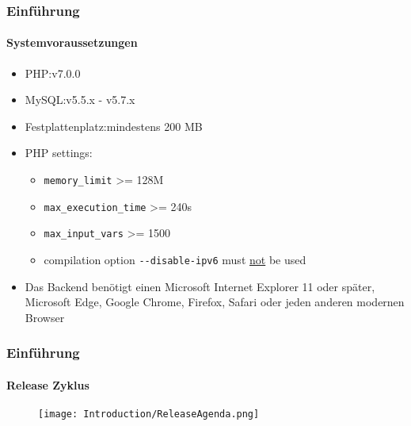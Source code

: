 \begin{frame}[fragile]
	\frametitle{Einführung}
	\framesubtitle{Systemvoraussetzungen}

	\begin{itemize}
		\item PHP:\tabto{3cm}v7.0.0
		\item MySQL:\tabto{3cm}v5.5.x - v5.7.x
		\item Festplattenplatz:\tabto{3cm}mindestens 200 MB
		\item PHP settings:

			\begin{itemize}
				\item \texttt{memory\_limit} >= 128M
				\item \texttt{max\_execution\_time} >= 240s
				\item \texttt{max\_input\_vars} >= 1500
				\item compilation option \texttt{-}\texttt{-disable-ipv6} must \underline{not} be used
			\end{itemize}

		\item Das Backend benötigt einen Microsoft Internet Explorer 11 oder später,
			Microsoft Edge, Google Chrome, Firefox, Safari oder jeden anderen modernen Browser

	\end{itemize}

\end{frame}

\begin{frame}[fragile]
	\frametitle{Einführung}
	\framesubtitle{Release Zyklus}

	\begin{figure}
		\texttt{[image: Introduction/ReleaseAgenda.png]}
	\end{figure}

\end{frame}

